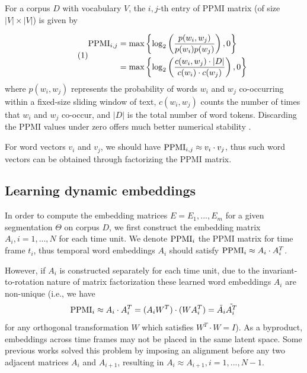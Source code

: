 \documentclass[output=paper]{langsci/langscibook}
\begin{document}
For a corpus $D$ with vocabulary $V$, the $i,j$-th entry of PPMI matrix (of size $|V| \times |V|$) is given by

\begin{equation}\tag{1}
\begin{aligned}
\textup{PPMI}_{i,j} &= \textup{max}\left \{ \log_2\left ( \frac{p(w_{i},w_{j})}{p(w_{i})p(w_{j})} \right ), 0 \right \} \\&= \textup{max}\left \{ \log_2\left (\frac{c(w_{i}, w_{j})\cdot |D|}{c(w_{i})\cdot c(w_{j})}  \right ), 0 \right \}
\label{ppmi}
\end{aligned}
\end{equation}
where $p(w_{i},w_{j})$ represents the probability of words $w_{i}$ and $w_{j}$ co-occurring within a fixed-size sliding window of text, $c(w_{i},w_{j})$ counts the number of times that $w_{i}$ and $w_{j}$ co-occur, and $|D|$ is the total number of word tokens. Discarding the PPMI values under zero offers much better numerical stability \citep{yao2018dynamic}.

For word vectors $v_{i}$ and $v_{j}$, we should have $\textup{PPMI}_{i,j} \approx v_{i}\cdot v_{j}$, thus such word vectors can be obtained through factorizing the PPMI matrix.

\subsection{Learning dynamic embeddings}
\label{Learning dynamic embeddings}
In order to compute the embedding matrices $E = {E_{1}, ..., E_{m}}$ for a given segmentation $\Theta$ on corpus $D$, we first construct the embedding matrix $A_{i}, i = 1, ..., N$ for each time unit. We denote $\textup{PPMI}_{i}$ the PPMI matrix for time frame $t_{i}$, thus temporal word embeddings $A_{i}$ should satisfy $\textup{PPMI}_{i} \approx A_{i}\cdot A_{i}^{T}$. 


However, if $A_{i}$ is constructed separately for each time unit, due to the invariant-to-rotation nature of matrix factorization these learned word embeddings $A_{i}$ are non-unique (i.e., we have \[\textup{PPMI}_{i} \approx A_{i}\cdot A_{i}^{T} =  (A_{i}W^{T})\cdot (WA_{i}^{T}) = \tilde{A_{i}}\tilde{A_{i}^{T}}\] for any orthogonal transformation $W$ which satisfies $W^{T}\cdot W = I$). As a byproduct, embeddings across time frames may not be placed in the same latent space. Some previous works \citep{kulkarni2015statistically,hamilton-etal-2016-diachronic,zhang-etal-2015-omnia} solved this problem by imposing an alignment before any two adjacent matrices $A_{i}$ and $A_{i + 1}$, resulting in $A_{i} \approx A_{i + 1}, i = 1, ..., N - 1$.
\end{document}
